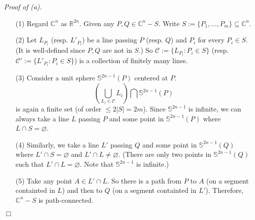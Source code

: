 \documentclass{article}
\begin{document}
\emph{Proof of (a).}
\begin{enumerate}
\item[(1)]
  Regard $\mathbb{C}^n$ as $\mathbb{R}^{2n}$.
  Given any $P, Q \in \mathbb{C}^n - S$.
  Write $S := \{ P_1, \ldots, P_m \} \subseteq \mathbb{C}^n$.

\item[(2)]
  Let $L_{P_i}$ (resp. $L'_{P_i}$) be a line passing $P$ (resp. $Q$) and $P_i$
  for every $P_i \in S$.
  (It is well-defined since $P, Q$ are not in $S$.)
  So $\mathscr{C} := \{ L_{P_i} : P_i \in S \}$
  (resp. $\mathscr{C}' := \{ L'_{P_i} : P_i \in S \}$)
  is a collection of finitely many lines.

\item[(3)]
  Consider a unit sphere $\mathbb{S}^{2n-1}(P)$ centered at $P$.
  \[
    \left( \bigcup_{L_i \in \mathscr{C}} L_i \right) \bigcap \mathbb{S}^{2n-1}(P)
  \]
  is again a finite set (of order $\leq 2|S| = 2m$).
  Since $\mathbb{S}^{2n-1}$ is infinite,
  we can always take a line $L$ passing $P$ and some point in $\mathbb{S}^{2n-1}(P)$
  where $L \cap S = \varnothing$.

\item[(4)]
  Similarly, we take a line $L'$ passing $Q$ and some point in $\mathbb{S}^{2n-1}(Q)$
  where $L' \cap S = \varnothing$ and $L' \cap L \neq \varnothing$.
  (There are only two points in $\mathbb{S}^{2n-1}(Q)$ such that $L' \cap L = \varnothing$.
  Note that $\mathbb{S}^{2n-1}$ is infinite.)

\item[(5)]
  Take any point $A \in L' \cap L$.
  So there is a path from $P$ to $A$ (on a segment containted in $L$)
  and then to $Q$ (on a segment containted in $L'$).
  Therefore, $\mathbb{C}^n - S$ is path-connected.
\end{enumerate}
$\Box$ \\
\end{document}
